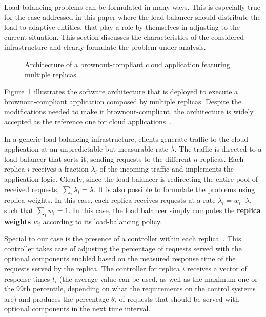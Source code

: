 Load-balancing problems can be formulated in many ways. This is
especially true for the case addressed in this paper where the
load-balancer should distribute the load to adaptive entities, that
play a role by themselves in adjusting to the current situation. This
section discusses the characteristics of the considered infrastructure
and clearly formulate the problem under analysis.

\begin{figure}[t]
  \centering 
   
  \caption{Architecture of a brownout-compliant cloud application
    featuring multiple replicas.}
  \label{fig:architecture}
\end{figure}

Figure~\ref{fig:architecture} illustrates the software architecture
that is deployed to execute a brownout-compliant application composed
by multiple replicas. Despite the modifications needed to make it
brownout-compliant, the architecture is widely accepted as the
reference one for cloud applications~\citep{Barroso09}.

In a generic load-balancing infrastructure, clients generate traffic
to the cloud application at an unpredictable but measurable rate
$\lambda$. The traffic is directed to a load-balancer that sorts it,
sending requests to the different $n$ replicas. Each replica $i$
receives a fraction $\lambda_i$ of the incoming traffic and implements
the application logic. Clearly, since the load balancer is redirecting
the entire pool of received requests, $\sum_i \lambda_i = \lambda$.
It is also possible to formulate the problems using replica weights.
In this case, each replica receives requests at a rate $\lambda_i =
w_i \cdot \lambda$, such that $\sum_{i} w_i = 1$. In this case, the
load balancer simply computes the \textbf{replica weights} $w_i$
according to its load-balancing policy.

Special to our case is the presence of a controller within each
replica~\cite{cloudish-tr}. This controller takes care of adjusting
the percentage of requests served with the optional components enabled
based on the measured response time of the requests served by the
replica. The controller for replica $i$ receives a vector of response
times $t_i$ (the average value can be used, as well as the maximum one
or the 99th percentile, depending on what the requirements on the
control systems are) and produces the percentage $\theta_i$ of
requests that should be served with optional components in the next
time interval.

